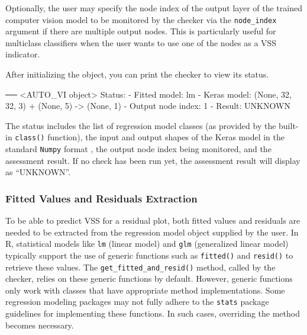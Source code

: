 \documentclass[
doublespace,
  times]{anzsauth}
\newenvironment{Shaded}{\begin{snugshade}}{\end{snugshade}}
\newcommand{\DecValTok}[1]{\textcolor[rgb]{0.68,0.00,0.00}{#1}}
\newcommand{\NormalTok}[1]{\textcolor[rgb]{0.00,0.23,0.31}{#1}}
\newcommand{\OtherTok}[1]{\textcolor[rgb]{0.00,0.23,0.31}{#1}}
\newcommand{\SpecialCharTok}[1]{\textcolor[rgb]{0.37,0.37,0.37}{#1}}
\begin{document}
Optionally, the user may specify the node index of the output layer of
the trained computer vision model to be monitored by the checker via the
\texttt{node\_index} argument if there are multiple output nodes. This
is particularly useful for multiclass classifiers when the user wants to
use one of the nodes as a VSS indicator.

After initializing the object, you can print the checker to view its
status.

\begin{Shaded}
\begin{Highlighting}[]
\NormalTok{── }\SpecialCharTok{\textless{}}\NormalTok{AUTO\_VI object}\SpecialCharTok{\textgreater{}}
\NormalTok{Status}\SpecialCharTok{:}
 \SpecialCharTok{{-}}\NormalTok{ Fitted model}\SpecialCharTok{:}\NormalTok{ lm}
 \SpecialCharTok{{-}}\NormalTok{ Keras model}\SpecialCharTok{:}\NormalTok{ (None, }\DecValTok{32}\NormalTok{, }\DecValTok{32}\NormalTok{, }\DecValTok{3}\NormalTok{) }\SpecialCharTok{+}\NormalTok{ (None, }\DecValTok{5}\NormalTok{) }\OtherTok{{-}\textgreater{}}\NormalTok{ (None, }\DecValTok{1}\NormalTok{)}
    \SpecialCharTok{{-}}\NormalTok{ Output node index}\SpecialCharTok{:} \DecValTok{1}
 \SpecialCharTok{{-}}\NormalTok{ Result}\SpecialCharTok{:}\NormalTok{ UNKNOWN }
\end{Highlighting}
\end{Shaded}

The status includes the list of regression model classes (as provided by
the built-in \texttt{class()} function), the input and output shapes of
the Keras model in the standard \texttt{Numpy} format
\citep{harris2020array}, the output node index being monitored, and the
assessment result. If no check has been run yet, the assessment result
will display as ``UNKNOWN''.

\subsubsection{Fitted Values and Residuals
Extraction}\label{fitted-values-and-residuals-extraction}

To be able to predict VSS for a residual plot, both fitted values and
residuals are needed to be extracted from the regression model object
supplied by the user. In R, statistical models like \texttt{lm} (linear
model) and \texttt{glm} (generalized linear model) typically support the
use of generic functions such as \texttt{fitted()} and \texttt{resid()}
to retrieve these values. The \texttt{get\_fitted\_and\_resid()} method,
called by the checker, relies on these generic functions by default.
However, generic functions only work with classes that have appropriate
method implementations. Some regression modeling packages may not fully
adhere to the \texttt{stats} package guidelines for implementing these
functions. In such cases, overriding the method becomes necessary.
\end{document}
